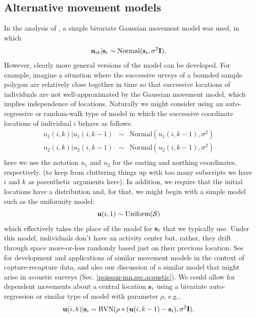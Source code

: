 \subsection{Alternative movement models}
\label{searchencounter.sec.movement}

In the analysis of \citet{royle_young:2008}, a simple bivariate
Gaussian movement model was used, in which
\[
 {\bf u}_{ik} | {\bf s}_{i} \sim \mbox{Normal}({\bf s}_{i}, \sigma^{2}{\bf I}),
\]
However, clearly more general versions of the model can be developed.
For example, imagine a situation where the successive urveys of a
bounded sample polygon are relatively close together in time so that
successive locations of individuals are not well-approximated by the
Gaussian movement model, which implies independence of
locations. Naturally we might consider using an auto-regressive or
random-walk type of model in which the successive coordinate locations
of individual $i$ behave as follows:
\begin{eqnarray*}
 u_{1}(i,k) | u_{1}(i,k-1) &\sim &  \mbox{Normal}( u_{1}(i,k-1),  \sigma^{2}) \\
 u_{2}(i,k) | u_{2}(i,k-1) &\sim &  \mbox{Normal}( u_{2}(i,k-1),  \sigma^{2}) \\
\end{eqnarray*}
here we use the notation $u_{1}$ and $u_{2}$ for the easting and
northing coordinates, respectively. (to keep from cluttering things up
with too many subscripts we have $i$ and $k$ as parenthetic arguments
here).  In addition, we require that the initial locations have a
distribution and, for that, we might begin with a simple model such as
the uniformity model:
\[
 {\bf u}(i,1) \sim \mbox{Uniform}({\cal S})
\]
which effectively takes the place of the model for ${\bf s}_{i}$ that
we typically use. Under this model, individuals don't have an activity
center but, rather, they drift through space more-or-less randomly
based just on their previous location. See \citet{ovaskainen:2004,
  ovaskainen:2008} for development and applications of similar
movement models in the context of capture-recapture data,
and also our discussion of a similar model that might arise in
acoustic surveys (Sec. \ref{poisson-mn.sec.acoustic}).  We could allow
for dependent movements about a central location ${\bf s}_{i}$ using a
bivariate auto-regression or similar type of model with parameter
$\rho$, e.g.,
\[
 {\bf u}(i,k) | {\bf s}_{i} \sim   \mbox{BVN}( \rho*( {\bf u}(i,k-1) - {\bf s}_{i} ),  \sigma^{2} {\bf I}).
\]


